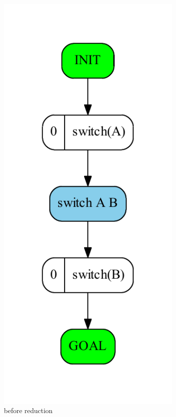	\begin{figure}
		\begin{subfigure}[b]{0.4\textwidth}
			\includegraphics[scale=0.4]{halfCycle/figures/simple_input}
			\caption{before reduction}
		\end{subfigure}	
		\begin{subfigure}[b]{0.4\textwidth}

\end{subfigure}
\end{figure}
